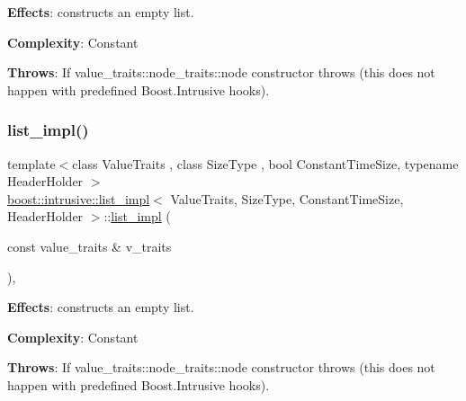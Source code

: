 {\bfseries Effects}\+: constructs an empty list.

{\bfseries Complexity}\+: Constant

{\bfseries Throws}\+: If value\+\_\+traits\+::node\+\_\+traits\+::node constructor throws (this does not happen with predefined Boost.\+Intrusive hooks). \mbox{\label{classboost_1_1intrusive_1_1list__impl_aec7438abf9f510b1bea085bf3ab562e9}} 
\subsubsection{\texorpdfstring{list\+\_\+impl()}{list\_impl()}\hspace{0.1cm}{\footnotesize\ttfamily [2/4]}}
{\footnotesize\ttfamily template$<$class Value\+Traits , class Size\+Type , bool Constant\+Time\+Size, typename Header\+Holder $>$ \\
\hyperlink{classboost_1_1intrusive_1_1list__impl}{boost\+::intrusive\+::list\+\_\+impl}$<$ Value\+Traits, Size\+Type, Constant\+Time\+Size, Header\+Holder $>$\+::\hyperlink{classboost_1_1intrusive_1_1list__impl}{list\+\_\+impl} (\begin{DoxyParamCaption}\item[{const value\+\_\+traits \&}]{v\+\_\+traits }\end{DoxyParamCaption})\hspace{0.3cm}{\ttfamily [inline]}, {\ttfamily [explicit]}}

{\bfseries Effects}\+: constructs an empty list.

{\bfseries Complexity}\+: Constant

{\bfseries Throws}\+: If value\+\_\+traits\+::node\+\_\+traits\+::node constructor throws (this does not happen with predefined Boost.\+Intrusive hooks). \mbox{\label{classboost_1_1intrusive_1_1list__impl_a7d841d7401e3bdac5353785ceb4e8faf}} 
